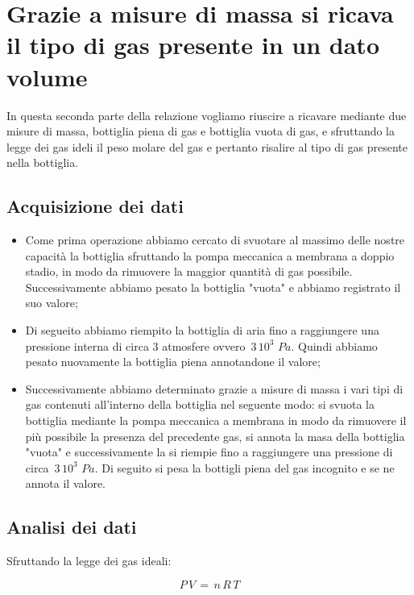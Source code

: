\section{Grazie a misure di massa si ricava il tipo di gas presente in un dato volume}   

In questa seconda parte della relazione vogliamo riuscire a ricavare mediante due misure di massa, bottiglia piena di gas e bottiglia vuota di gas, e sfruttando la legge dei gas ideli il peso molare del gas e pertanto risalire al tipo di gas presente nella bottiglia.

\subsection{Acquisizione dei dati}

\begin{itemize}
	\item{Come prima operazione abbiamo cercato di svuotare al massimo delle nostre capacità la bottiglia sfruttando la pompa meccanica a membrana a doppio stadio, in modo da rimuovere la maggior quantità di gas possibile. Successivamente abbiamo pesato la bottiglia "vuota" e abbiamo registrato il suo valore;}
	\item{Di segueito abbiamo riempito la bottiglia di aria fino a raggiungere una pressione interna di circa 3 atmosfere ovvero $\,3\,10^3\,\,Pa$. Quindi abbiamo pesato nuovamente la bottiglia piena annotandone il valore;}
	\item{Successivamente abbiamo determinato grazie a misure di massa i vari tipi di gas contenuti all'interno della bottiglia nel seguente modo: si svuota la bottiglia mediante la pompa meccanica a membrana in modo da rimuovere il più possibile la presenza del precedente gas, si annota la masa della bottiglia "vuota" e successivamente la si riempie fino a raggiungere una pressione di circa $\,3\,10^3\,\,Pa$. Di seguito si pesa la bottigli piena del gas incognito e se ne annota il valore.}
\end{itemize}

\subsection{Analisi dei dati}

Sfruttando la legge dei gas ideali:

\begin{equation}
	P\,V \,=\, n\,R\,T
\end{equation}

